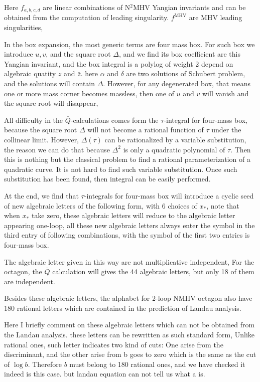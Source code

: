 \documentclass[a4paper,11pt]{article}
\begin{document}
Here $f_{a,b,c,d}$ are linear combinations of N$^{2}$MHV Yangian invariants and can be obtained from the computation of leading singularity. $f^{\text{MHV}}$ are MHV leading singularities, 



In the box expansion, the most generic terms are four mass box. For such box we introduce $u,v$, and the square root $\Delta$, and we find its box coefficient are this Yangian invariant, and the box integral is a polylog of weight 2 depend on algebraic quatity $z$ and $\bar{z}$. here $\alpha$ and $\delta$ are two solutions of Schubert problem, and the solutions will contain $\Delta$. However, for any degenerated box, that means one or more mass corner becomes massless, then one of $u$ and $v$ will vanish and the square root will disappear, 



All difficulty in the $\bar{Q}$-calculations comes form the $\tau$-integral for four-mass box, because the square root $\Delta$ will not become a rational function of $\tau$ under the collinear limit. However, $\Delta(\tau )$ can be rationalized by a variable substitution, the reason we can do that because $\Delta^{2}$ is only a quadratic polynomial of $\tau$. Then this is nothing but the classical problem to find a rational parameterization of a quadratic curve. It is not hard to find such variable substitution. Once such substitution has been found, then integral can be easily performed. 



At the end, we find that $\tau$-integrals for four-mass box will introduce a cyclic seed of new algebraic letters of the following form, with 6 choices of $x_{\ast}$, note that when $x_{\ast}$ take zero, these algebraic letters will reduce to the algebraic letter appearing one-loop, all these new algebraic letters always enter the symbol in the third entry of following combinations, with the symbol of the first two entries is four-mass box.



The algebraic letter given in this way are not multiplicative independent, For the octagon, the $\bar{Q}$ calculation will gives the 44 algebraic letters, but only 18 of them are independent.  

Besides these algebraic letters, the alphabet for 2-loop NMHV octagon also have 180 rational letters which are contained in the prediction of Landau analysis. 

Here I briefly comment on these algebraic letters which can not be obtained from the Landau analysis. these letters can be rewritten as such standard form, Unlike rational ones, such letter indicates two kind of cuts: One arise from the discriminant, and the other arise from b goes to zero which is the same as the cut of $\log b$. Therefore $b$ must belong to 180 rational ones, and we have checked it indeed is this case. but  landau equation can not tell us what a is.
\end{document}
